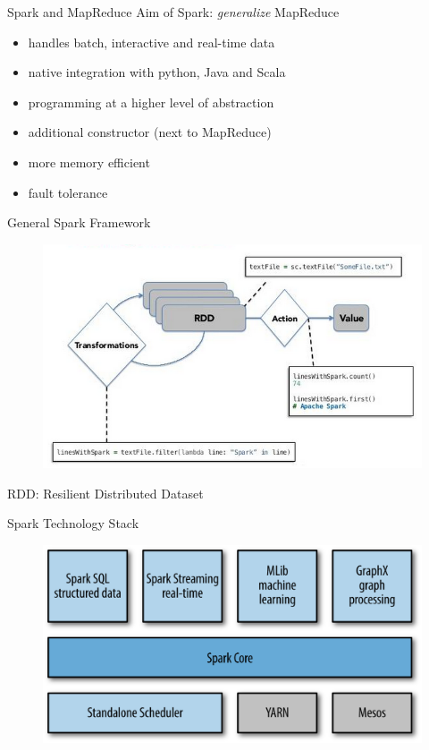 \documentclass{beamer}
\begin{document}
\begin{frame}{Spark and MapReduce}
  Aim of Spark: \emph{generalize} MapReduce
  \begin{itemize}
    \item handles batch, interactive and real-time data
    \item native integration with python, Java and Scala
    \item programming at a higher level of abstraction
    \item additional constructor (next to MapReduce)
    \item more memory efficient
    \item fault tolerance
  \end{itemize}
\end{frame}

\begin{frame}[t]{General Spark Framework}
  \begin{figure}
    \centering
    \includegraphics[scale=0.35]{figure/spark_rdd.png}
  \end{figure}
  RDD: Resilient Distributed Dataset
\end{frame}

\begin{frame}[t]{Spark Technology Stack}
  \begin{figure}
    \centering
    \includegraphics[scale=0.9]{figure/spark_stack.png}
  \end{figure}
\end{frame}
\end{document}
